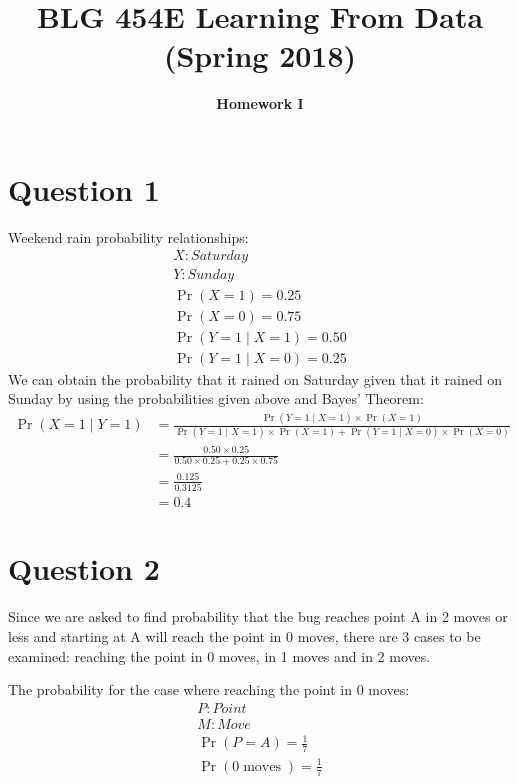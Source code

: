 \documentclass{article}
\DeclareMathOperator{\CondProb}{Pr}
\DeclareMathOperator{\moves}{moves}
\begin{document}
\title{\bf BLG 454E Learning From Data (Spring 2018)}
\author{\bf Homework I}
\date{}
\maketitle


\section{Question 1}
Weekend rain probability relationships:
\begin{equation*}
	\begin{aligned}
	X : Saturday \\
	Y : Sunday \\
	\CondProb{(X = 1)} = 0.25 \\
	\CondProb{(X = 0)} = 0.75 \\
	\CondProb{(Y = 1 \mid X = 1)} = 0.50 \\
	\CondProb{(Y = 1 \mid X = 0)} = 0.25 
	\end{aligned}
\end{equation*}
	We can obtain the probability that it rained on Saturday given that it rained on Sunday by using the probabilities given above and Bayes' Theorem:
\begin{equation*}
\begin{split}
	\CondProb{(X = 1 \mid Y = 1)} &=\frac{\CondProb{(Y = 1 \mid X = 1)}\times \CondProb{(X = 1)}}{\CondProb{(Y = 1 \mid X = 1)}\times \CondProb{(X = 1)} + \CondProb{(Y = 1 \mid X = 0)}\times \CondProb{(X = 0)}} \\
	&= \frac{0.50\times 0.25}{0.50\times 0.25 + 0.25\times 0.75} \\
	&= \frac{0.125}{0.3125} \\
	&= \boxed{0.4}
\end{split}
\end{equation*}
\section{Question 2}
Since we are asked to find probability that the bug reaches point A in 2 moves or less and starting at A will reach the point in 0 moves, there are 3 cases to be examined: reaching the point in 0 moves, in 1 moves and in 2 moves.

The probability for the case where reaching the point in 0 moves:  
\begin{equation*}
	\begin{aligned}
	P: Point \\
	M: Move \\
	\CondProb{(P = A)} = \frac{1}{7} \\
	\CondProb{(0 \moves)} = \frac{1}{7}
	\end{aligned}
\end{equation*}
 
\end{document}
